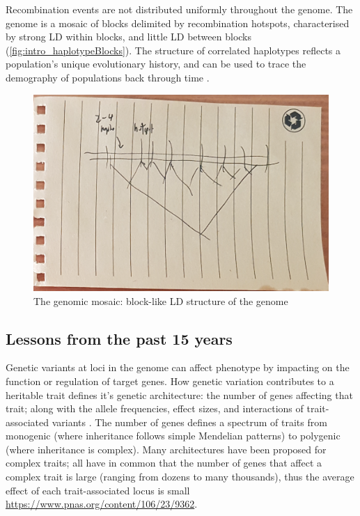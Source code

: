 \begin{outline}
Recombination events are not distributed uniformly throughout the genome.
The genome is a mosaic of blocks delimited by recombination hotspots, 
characterised by strong \gls{LD} within blocks, and little \gls{LD} between blocks \autocite{wall2003HaplotypeBlocksLinkage,theinternationalhapmapconsortium2007SecondGenerationHuman} (\autoref{fig:intro_haplotypeBlocks}).
The structure of correlated haplotypes reflects a population's unique evolutionary history, and can be used to trace the demography of populations back through time \autocite{karczewski2020AnalyticTranslationalGenetics}.

\begin{figure}
    \centering
    \includegraphics[width=1.0\textwidth,page=1]{mainmatter/figures/chapter_01/fig_mockup_haplotypeBlocks_Screenshot 2020-05-21 at 17.08.33.png}
    \caption{The genomic mosaic: block-like \gls{LD} structure of the genome}
    \label{fig:intro_haplotypeBlocks}
\end{figure}

\subsection{Lessons from the past 15 years}

\1 Genetic variants at loci in the genome can affect phenotype by impacting on the function or regulation of target genes.
How genetic variation contributes to a heritable trait defines it's genetic architecture: 
the number of genes affecting that trait; along with the allele frequencies, effect sizes, and interactions of trait-associated variants \autocite{visscher2019Fisher1918Paper}.
The number of genes defines a spectrum of traits from monogenic (where inheritance follows simple Mendelian patterns) to polygenic (where inheritance is complex).
Many architectures have been proposed for complex traits; all have in common that the number of genes that affect a complex trait is large (ranging from dozens to many thousands),
thus the average effect of each trait-associated locus is small \autocite{gibson2011RareCommonVariants,boyle2017ExpandedViewComplex} \url{https://www.pnas.org/content/106/23/9362}.


\end{outline}
